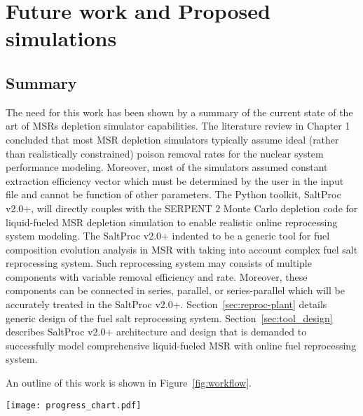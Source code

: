 \chapter[Future work and Proposed simulations]{Future work and Proposed 
simulations}

\section{Summary}
The need for this work has been shown by a summary of the current state of the 
art of \glspl{MSR} depletion simulator capabilities. The literature review in 
Chapter 1 concluded that most \gls{MSR} depletion simulators typically assume 
ideal (rather than realistically constrained) poison removal rates for the 
nuclear system performance modeling. Moreover, most of the simulators assumed 
constant extraction efficiency vector which must be determined by the user in 
the input file and cannot be function of other parameters. The Python toolkit, 
SaltProc v2.0+, will directly couples with the SERPENT 2 Monte Carlo depletion 
code for liquid-fueled \gls{MSR} depletion simulation to enable realistic 
online reprocessing system modeling. The SaltProc v2.0+ indented to be a 
generic tool for fuel composition evolution analysis in \gls{MSR} with taking 
into account complex fuel salt reprocessing system. Such reprocessing system 
may consists of multiple components with variable removal efficiency and rate.
Moreover, these components can be connected in series, parallel, or 
series-parallel which will be accurately treated in the SaltProc v2.0+. 
Section~\ref{sec:reproc-plant} details generic design of the fuel salt 
reprocessing system. Section~\ref{sec:tool_design} describes SaltProc v2.0+ 
architecture and design that is demanded to successfully model comprehensive 
liquid-fueled \gls{MSR} with online fuel reprocessing system. 

An outline of this work is shown in Figure~\ref{fig:workflow}.
 \begin{sidewaysfigure}[ht!] %
 	\centering
 	\texttt{[image: progress\_chart.pdf]} 
 	\caption{Workflow for the simulations proposed in this work..}
 	\label{fig:workflow}
 \end{sidewaysfigure}
 \FloatBarrier
 
 
